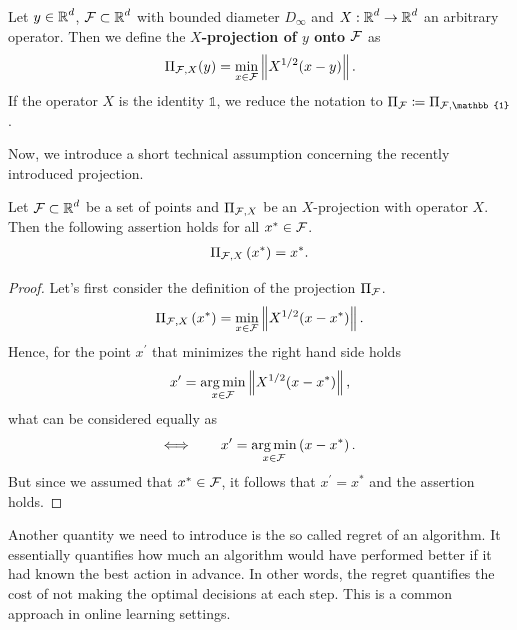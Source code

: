 \begin{definition}\label{def:projection}
Let $y\in\operatorname{\mathbb{R}}^d$, $\operatorname{\mathcal{F}}\subset\operatorname{\mathbb{R}}^d$ with bounded diameter $D_{\infty}$ and $X:\operatorname{\mathbb{R}}^d\to\operatorname{\mathbb{R}}^d$ an arbitrary operator. Then we define the \textbf{$X$-projection of $y$ onto $\operatorname{\mathcal{F}}$} as
\begin{align*}
\Pi_{\operatorname{\mathcal{F}},X} (y) = \min_{x\in\operatorname{\mathcal{F}}} \left\|X^{1/2}(x - y) \right\|.
\end{align*}
If the operator $X$ is the identity $\mathbb{1}$, we reduce the notation to $\Pi_{\F} \coloneqq \Pi_{\F,\mathbb{1}}$.
\end{definition}

Now, we introduce a short technical assumption concerning the recently introduced projection.

\begin{lemma}\label{lemma:projection}
Let $\operatorname{\mathcal{F}}\subset\operatorname{\mathbb{R}}^d$ be a set of points and $\Pi_{\operatorname{\mathcal{F}}, X}$ be an $X$-projection with operator $X$.\\
Then the following assertion holds for all $x^{\ast}\in \operatorname{\mathcal{F}}$.
\begin{align*}
\Pi_{\operatorname{\mathcal{F}}, X} \left(x^{\ast}\right) = x^{\ast}.
\end{align*}
\end{lemma}

\begin{proof}
Let's first consider the definition of the projection $\Pi_{\operatorname{\mathcal{F}}}$.
\begin{align*}
\Pi_{\operatorname{\mathcal{F}}, X} \left(x^{\ast}\right) = \min_{x\in\operatorname{\mathcal{F}}} \left\|X^{1/2}(x - x^{\ast}) \right\|.
\end{align*}
Hence, for the point $x^{\prime}$ that minimizes the right hand side holds
\begin{align*}
x^{\prime} = \operatorname*{arg\,min}_{x\in\operatorname{\mathcal{F}}}\left\|X^{1/2}(x - x^{\ast}) \right\|,
\end{align*}
what can be considered equally as
\begin{align*}
\Longleftrightarrow \qquad x^{\prime} = \operatorname*{arg\,min}_{x\in\operatorname{\mathcal{F}}}\left(x - x^{\ast}\right).
\end{align*}
But since we assumed that $x^{\ast}\in\operatorname{\mathcal{F}}$, it follows that $x^{\prime} = x^{\ast}$ and the assertion holds.
\end{proof}

Another quantity we need to introduce is the so called regret of an algorithm. It essentially quantifies how much an algorithm would have performed better if it had known the best action in advance. In other words, the regret quantifies the cost of not making the optimal decisions at each step. This is a common approach in online learning settings.

